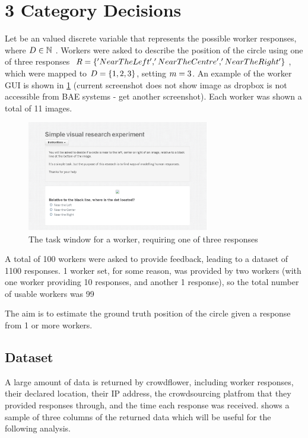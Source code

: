 \section{3 Category Decisions}
Let \possResVec be an \nPossRes valued discrete variable that represents the possible worker responses, where $D \in \mathbb{N}$ .
Workers were asked to describe the position of the circle using one of three responses $R = \lbrace 'NearTheLeft', 'NearTheCentre' , 'NearTheRight'\rbrace$, which were mapped to $D=\lbrace 1,2,3 \rbrace$, setting $m=3$.
An example of the worker GUI is shown in \ref{Figure:crowdflower_question_3} (current screenshot does not show image as dropbox is not accessible from BAE systems - get another screenshot). 
Each worker was shown a total of  11 images. 

\begin{figure}
  \centering
  \includegraphics[width=8cm]{crowdflower_gui_noimage.png}
  \caption{The task window for a worker, requiring one of three responses}
  \label{Figure:crowdflower_question_3}
\end{figure}

A total of 100 workers were asked to provide feedback, leading to a dataset of 1100 responses. 
1 worker set, for some reason, was provided by two workers (with one worker providing 10 responses, and another 1 response), so the total number of usable workers was 99

The aim is to estimate the ground truth position of the circle given a response from 1 or more workers. 

\subsection{Dataset}

A large amount of data is returned by crowdflower, including worker responses, their declared location, their IP address, the crowdsourcing platfrom that they provided responses through, and the time each response was received. 
 shows a sample of three columns of the returned data which will be useful for the following analysis.


